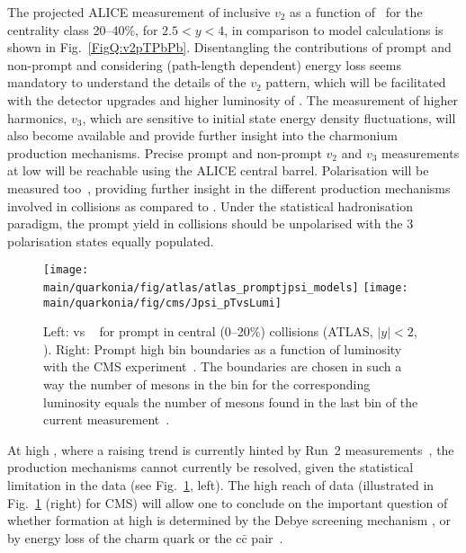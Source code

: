 \documentclass[../report.tex]{subfiles}
\providecommand{\main}{..}
\begin{document}
The projected ALICE measurement of inclusive \PJgy $v_2$ as a function of \pT\ for the centrality class 20--40\%, for $2.5<y<4$, in comparison to model calculations \cite{Du:2015wha} is shown in Fig.~\ref{FigQ:v2pTPbPb}. 
Disentangling the contributions of prompt and non-prompt \PJgy and considering (path-length dependent) energy loss seems mandatory to understand the details of the \PJgy $v_2$ pattern, which will be facilitated with the detector upgrades and higher luminosity of \RunsThreeFour.
The measurement of higher harmonics, \eg $v_3$, which are sensitive to initial state energy density fluctuations, will also become available
and  provide further insight into the charmonium production mechanisms. Precise prompt and non-prompt \PJgy $v_2$ and $v_3$ measurements
at low \pt will be reachable using the ALICE central barrel. Polarisation will be measured too~\cite{Abelevetal:2014cna}, providing further insight in the different production mechanisms involved in \PbPb collisions as compared to \pp. Under the statistical hadronisation paradigm, the prompt \PJgy yield in \PbPb collisions should be unpolarised with the 3 polarisation states equally populated.

\begin{figure}[h]
\begin{center}
 \texttt{[image: \\main/quarkonia/fig/atlas/atlas\_promptjpsi\_models]}
 \texttt{[image: \\main/quarkonia/fig/cms/Jpsi\_pTvsLumi]}
\end{center}
\caption{Left: \RAA vs \pT~ for prompt \PJgy in central (0--20\%) collisions (ATLAS, $|y|<2$, \cite{Aaboud:2018quy}). Right: Prompt \PJgy high \pt bin boundaries as a function of luminosity with the CMS experiment~\cite{CMS-PAS-FTR-18-024}. The boundaries are chosen in such a way the number of mesons in the bin for the corresponding luminosity equals the number of mesons found in the last \pt bin of the current measurement~\cite{Sirunyan:2017isk}.
}
\label{FigQ:JpTPbPb}
\end{figure}

At high \pT, where a raising trend is currently hinted by Run~2 \raa measurements~\cite{Sirunyan:2017isk,Aaboud:2018quy}, the production mechanisms cannot currently be resolved, given the statistical limitation in the data (see Fig.~\ref{FigQ:JpTPbPb}, left). The high \pt reach of \RunsThreeFour data (illustrated in Fig.~\ref{FigQ:JpTPbPb} (right) for CMS) will allow one to conclude on the important question of whether \PJgy
formation at high \pt is determined by the Debye screening mechanism \cite{Kopeliovich:2014una,Aronson:2017ymv}, or by %
energy loss of the charm quark or the $\text{c}\bar{\text{c}}$ pair~\cite{Spousta:2016agr,Arleo:2017ntr}.
\end{document}
